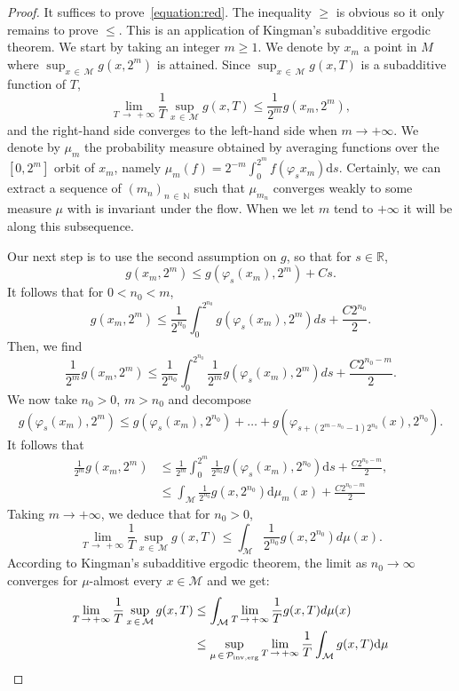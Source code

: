 \documentclass[AHL,Unicode,longabstracts,published]{cedram}
\newcommand{\R}{\mathbb{R}}
\newcommand{\N}{\mathbb{N}}
\newcommand{\mc}{\mathcal}
\newcommand{\M}{\mathcal{M}}
\newcommand{\dd}{\mathrm{d}}
\newcommand{\inverg}{\mathrm{inv,erg}}
\begin{document}
\begin{proof}
It suffices to prove~\eqref{equation:red}. The inequality $\geq$ is obvious so it only remains to prove $\leq$. This is an application of Kingman's subadditive ergodic theorem. We start by taking an integer $m \geq 1$. We denote by $x_m$ a point in $M$ where $\sup_{x\,\in\,\M} g(x, 2^m)$ is attained. Since $\sup_{x\,\in\,\M} g(x,T)$ is a subadditive function of $T$,
\[
\lim_{T\,\rightarrow\,+\infty} \frac{1}{T} \sup_{x\,\in\,\M} g(x,T) \leq \frac{1}{2^m} g\left(x_m, 2^m\right),
\]
and the right-hand side converges to the left-hand side when $m\to + \infty$. We denote by $\mu_m$ the probability measure obtained by averaging functions over the $[0,2^m]$ orbit of $x_m$, namely $\mu_m(f) = 2^{-m} \int_0^{2^m} f(\varphi_s x_m) \dd s$. Certainly, we can extract a sequence of $(m_n)_{n\,\in\,\N}$ such that $\mu_{m_n}$ converges weakly to some measure $\mu$ with is invariant under the flow. When we let $m$ tend to $+\infty$ it will be along this subsequence.

Our next step is to use the second assumption on $g$, so that for $s\in \R$,
\[
g\left(x_m, 2^m\right) \leq g\left(\varphi_s(x_m), 2^m\right) + C s.
\]
It follows that for $ 0 < n_0 < m$,
\[
g\left(x_m, 2^m\right) \leq \frac{1}{2^{n_0}} \int_0^{2^{n_0}} g\left(\varphi_s(x_m), 2^m\right) ds + \frac{C 2^{n_0}}{2}.
\]
Then, we find
\[
\frac{1}{2^m} g\left(x_m, 2^m\right) \leq \frac{1}{2^{n_0}} \int_0^{2^{n_0}} \frac{1}{2^m} g\left(\varphi_s(x_m), 2^m\right) ds + \frac{C 2^{n_0-m}}{2}.
\]
We now take $n_0>0$, $m> n_0$ and decompose
\[
g\left(\varphi_s(x_m), 2^m\right) \leq g\left(\varphi_s(x_m), 2^{n_0}\right) + \dots + g\left(\varphi_{s+\left(2^{m-n_0}-1\right)2^{n_0}}(x), 2^{n_0}\right).
\]
It follows that
\begin{align*}
\frac{1}{2^m} g\left(x_m, 2^m\right) &\leq \frac{1}{2^{m}} \int_0^{2^{m}} \frac{1}{2^{n_0}} g\left(\varphi_s(x_m), 2^{n_0}\right) \dd s + \frac{C 2^{n_0-m}}{2},\\
&\leq \int_{\M} \frac{1}{2^{n_0}} g\left(x, 2^{n_0}\right) \dd \mu_m(x) + \frac{C 2^{n_0-m}}{2}
\end{align*}
Taking $m\to + \infty$, we deduce that for $n_0>0$,
\[
\lim_{T\,\rightarrow\,+\infty} \frac{1}{T} \sup_{x\,\in\,\M} g(x,T) \leq \int_{\M} \frac{1}{2^{n_0}} g\left(x, 2^{n_0}\right) d\mu(x).
\]
According to Kingman's subadditive ergodic theorem, the limit as $n_0 \rightarrow \infty$ converges for $\mu$-almost every $x \in \M$ and we get:
\begin{align*}
\lim_{T\,\rightarrow\,+\infty} \frac{1}{T} \sup_{x\,\in\,\M} g(x,T) &\leq \int_{\M} \lim_{T\,\rightarrow\,+\infty} \frac{1}{T} g(x, T) d\mu(x) \\
&\leq \sup_{\mu\,\in\,\mc{P}_{\inverg}} \lim_{T\,\rightarrow\,+\infty} \frac{1}{T}\int_{\M} g(x,T) \dd\mu\qedhere
\end{align*}
\end{proof}
\end{document}
